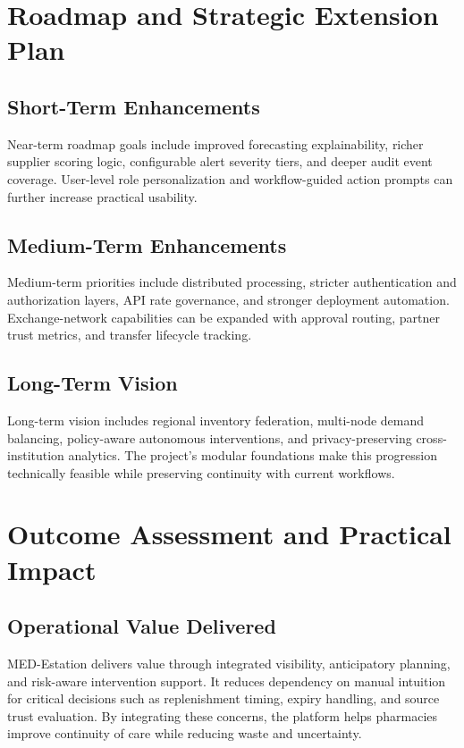 \documentclass[12pt,a4paper]{article}
\begin{document}
\section{Roadmap and Strategic Extension Plan}
\subsection{Short-Term Enhancements}
Near-term roadmap goals include improved forecasting explainability, richer supplier scoring logic, configurable alert severity tiers, and deeper audit event coverage. User-level role personalization and workflow-guided action prompts can further increase practical usability.

\subsection{Medium-Term Enhancements}
Medium-term priorities include distributed processing, stricter authentication and authorization layers, API rate governance, and stronger deployment automation. Exchange-network capabilities can be expanded with approval routing, partner trust metrics, and transfer lifecycle tracking.

\subsection{Long-Term Vision}
Long-term vision includes regional inventory federation, multi-node demand balancing, policy-aware autonomous interventions, and privacy-preserving cross-institution analytics. The project’s modular foundations make this progression technically feasible while preserving continuity with current workflows.

\section{Outcome Assessment and Practical Impact}
\subsection{Operational Value Delivered}
MED-Estation delivers value through integrated visibility, anticipatory planning, and risk-aware intervention support. It reduces dependency on manual intuition for critical decisions such as replenishment timing, expiry handling, and source trust evaluation. By integrating these concerns, the platform helps pharmacies improve continuity of care while reducing waste and uncertainty.
\end{document}
